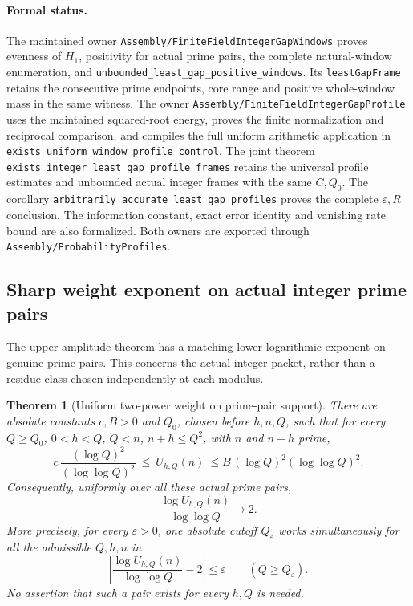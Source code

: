 \documentclass[11pt]{article}
\newtheorem{theorem}{Theorem}[section]
\begin{document}
\paragraph{Formal status.}
The maintained owner
\texttt{Assembly/FiniteFieldIntegerGapWindows}
proves evenness of \(H_1\), positivity for actual prime pairs,
the complete natural-window enumeration, and
\texttt{unbounded\_least\_gap\_positive\_windows}.
Its \texttt{leastGapFrame} retains the consecutive prime endpoints,
core range and positive whole-window mass in the same witness.
The owner
\texttt{Assembly/FiniteFieldIntegerGapProfile}
uses the maintained squared-root energy, proves the finite
normalization and reciprocal comparison, and compiles the full
uniform arithmetic application in
\texttt{exists\_uniform\_window\_profile\_control}.
The joint theorem
\texttt{exists\_integer\_least\_gap\_profile\_frames}
retains the universal profile estimates and unbounded actual
integer frames with the same \(C,Q_0\).
The corollary
\texttt{arbitrarily\_accurate\_least\_gap\_profiles}
proves the complete \(\varepsilon,R\) conclusion.
The information constant, exact error identity and vanishing
rate bound are also formalized. Both owners are exported through
\texttt{Assembly/ProbabilityProfiles}.

\subsection{Sharp weight exponent on actual integer prime pairs}
The upper amplitude theorem has a matching lower logarithmic exponent
on genuine prime pairs. This concerns the actual integer packet,
rather than a residue class chosen independently at each modulus.

\begin{theorem}[Uniform two-power weight on prime-pair support]
\label{thm:integer-pair-two-power-weight}
There are absolute constants \(c,B>0\) and \(Q_0\), chosen before
\(h,n,Q\), such that for every \(Q\geq Q_0\), \(0<h<Q\),
\(Q<n\), \(n+h\leq Q^2\), with \(n\) and \(n+h\) prime,
\[
 c\,\frac{(\log Q)^2}{(\log\log Q)^2}
 \ \leq\ U_{h,Q}(n)\
 \leq B\,(\log Q)^2(\log\log Q)^2 .
 \tag{WP}
\]
Consequently, uniformly over all these actual prime pairs,
\[
                 \frac{\log U_{h,Q}(n)}{\log\log Q}\longrightarrow2.
 \tag{WE}
\]
More precisely, for every \(\varepsilon>0\), one absolute cutoff
\(Q_\varepsilon\) works simultaneously for all the admissible
\(Q,h,n\) in
\[
 \left|\frac{\log U_{h,Q}(n)}{\log\log Q}-2\right|
       \leq\varepsilon\qquad(Q\geq Q_\varepsilon).
\]
No assertion that such a pair exists for every \(h,Q\) is needed.
\end{theorem}
\end{document}
